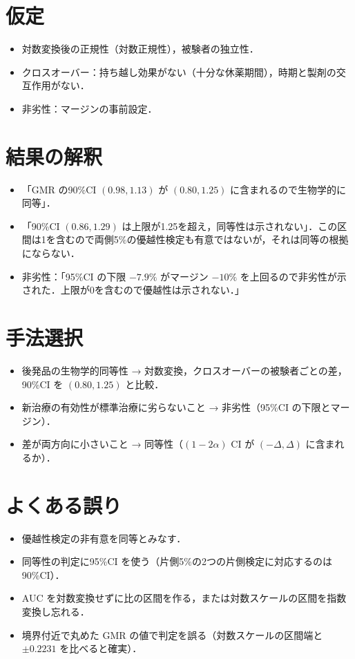 \section{仮定}\label{sec:13-assump}
\begin{itemize}
\item 対数変換後の正規性（対数正規性），被験者の独立性．
\item クロスオーバー：持ち越し効果がない（十分な休薬期間），時期と製剤の交互作用がない．
\item 非劣性：マージンの事前設定．
\end{itemize}

\section{結果の解釈}\label{sec:13-interp}
\begin{itemize}
\item 「GMR の90\%CI $(0.98,1.13)$ が $(0.80,1.25)$ に含まれるので生物学的に同等」．
\item 「90\%CI $(0.86,1.29)$ は上限が1.25を超え，同等性は示されない」．この区間は1を含むので両側5\%の優越性検定も有意ではないが，それは同等の根拠にならない．
\item 非劣性：「95\%CI の下限 $-7.9\%$ がマージン $-10\%$ を上回るので非劣性が示された．上限が0を含むので優越性は示されない．」
\end{itemize}

\section{手法選択}\label{sec:13-choice}
\begin{itemize}
\item 後発品の生物学的同等性 → 対数変換，クロスオーバーの被験者ごとの差，90\%CI を $(0.80,1.25)$ と比較．
\item 新治療の有効性が標準治療に劣らないこと → 非劣性（95\%CI の下限とマージン）．
\item 差が両方向に小さいこと → 同等性（$(1-2\alpha)$ CI が $(-\Delta,\Delta)$ に含まれるか）．
\end{itemize}

\section{よくある誤り}\label{sec:13-err}
\begin{warnbox}
\begin{itemize}
\item 優越性検定の非有意を同等とみなす．
\item 同等性の判定に95\%CI を使う（片側5\%の2つの片側検定に対応するのは90\%CI）．
\item AUC を対数変換せずに比の区間を作る，または対数スケールの区間を指数変換し忘れる．
\item 境界付近で丸めた GMR の値で判定を誤る（対数スケールの区間端と $\pm0.2231$ を比べると確実）．
\end{itemize}
\end{warnbox}

